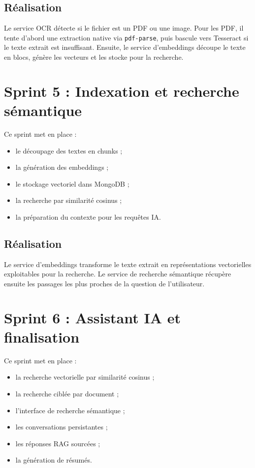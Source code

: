 \documentclass[12pt,a4paper]{report}
\begin{document}
\subsection{Réalisation}
Le service OCR détecte si le fichier est un PDF ou une image. Pour les PDF, il tente d'abord une extraction native via \texttt{pdf-parse}, puis bascule vers Tesseract si le texte extrait est insuffisant. Ensuite, le service d'embeddings découpe le texte en blocs, génère les vecteurs et les stocke pour la recherche.

\section{Sprint 5 : Indexation et recherche sémantique}
Ce sprint met en place :
\begin{itemize}
  \item le découpage des textes en chunks ;
  \item la génération des embeddings ;
  \item le stockage vectoriel dans MongoDB ;
  \item la recherche par similarité cosinus ;
  \item la préparation du contexte pour les requêtes IA.
\end{itemize}

\subsection{Réalisation}
Le service d'embeddings transforme le texte extrait en représentations vectorielles exploitables pour la recherche. Le service de recherche sémantique récupère ensuite les passages les plus proches de la question de l'utilisateur.

\section{Sprint 6 : Assistant IA et finalisation}
Ce sprint met en place :
\begin{itemize}
  \item la recherche vectorielle par similarité cosinus ;
  \item la recherche ciblée par document ;
  \item l'interface de recherche sémantique ;
  \item les conversations persistantes ;
  \item les réponses RAG sourcées ;
  \item la génération de résumés.
\end{itemize}
\end{document}
